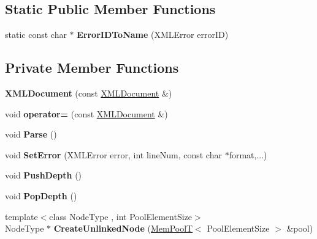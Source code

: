 \subsection*{Static Public Member Functions}
\begin{DoxyCompactItemize}
\item 
\mbox{\label{classtinyxml2_1_1XMLDocument_aba60537a6ee44c2b8e010c6ffc84ccfe}} 
static const char $\ast$ {\bfseries Error\+I\+D\+To\+Name} (X\+M\+L\+Error error\+ID)
\end{DoxyCompactItemize}
\subsection*{Private Member Functions}
\begin{DoxyCompactItemize}
\item 
\mbox{\label{classtinyxml2_1_1XMLDocument_adcea490db02a099d99440cd14a87d9e4}} 
{\bfseries X\+M\+L\+Document} (const \mbox{\hyperlink{classtinyxml2_1_1XMLDocument}{X\+M\+L\+Document}} \&)
\item 
\mbox{\label{classtinyxml2_1_1XMLDocument_aa542c2cf1276ee4bd778f16d196fe222}} 
void {\bfseries operator=} (const \mbox{\hyperlink{classtinyxml2_1_1XMLDocument}{X\+M\+L\+Document}} \&)
\item 
\mbox{\label{classtinyxml2_1_1XMLDocument_aeb556e0e2bed02a73a6c5aaf19759e9a}} 
void {\bfseries Parse} ()
\item 
\mbox{\label{classtinyxml2_1_1XMLDocument_abffeba53b165f55f385ea7063a93bc95}} 
void {\bfseries Set\+Error} (X\+M\+L\+Error error, int line\+Num, const char $\ast$format,...)
\item 
\mbox{\label{classtinyxml2_1_1XMLDocument_a4d4aa7ec8e078ee6b449471e187d2d67}} 
void {\bfseries Push\+Depth} ()
\item 
\mbox{\label{classtinyxml2_1_1XMLDocument_a863c45ff542c2b76af0e6c227a743c85}} 
void {\bfseries Pop\+Depth} ()
\item 
\mbox{\label{classtinyxml2_1_1XMLDocument_acda2123b71a6e6534be9f48e75ea680a}} 
{\footnotesize template$<$class Node\+Type , int Pool\+Element\+Size$>$ }\\Node\+Type $\ast$ {\bfseries Create\+Unlinked\+Node} (\mbox{\hyperlink{classtinyxml2_1_1MemPoolT}{Mem\+PoolT}}$<$ Pool\+Element\+Size $>$ \&pool)
\end{DoxyCompactItemize}
